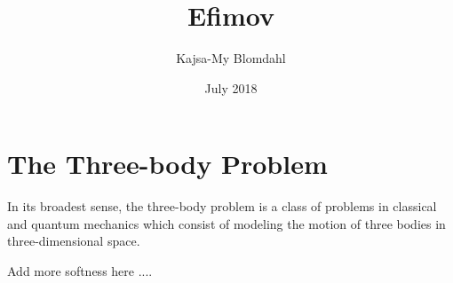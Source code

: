 \documentclass{article}
\title{Efimov}
\author{Kajsa-My Blomdahl}
\date{July 2018}
\begin{document}
\maketitle

\section{The Three-body Problem}
In its broadest sense, the three-body problem is a class of problems in classical and quantum mechanics which consist of modeling the motion of three bodies in three-dimensional space.   

Add more softness here ....
  




\end{document}
